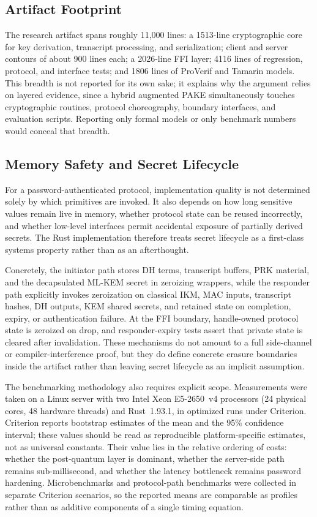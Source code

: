 \documentclass[conference]{IEEEtran}
\begin{document}
\subsection{Artifact Footprint}

The research artifact spans roughly 11{,}000 lines: a 1513-line cryptographic core for key derivation, transcript processing, and serialization; client and server contours of about 900 lines each; a 2026-line FFI layer; 4116 lines of regression, protocol, and interface tests; and 1806 lines of ProVerif and Tamarin models. This breadth is not reported for its own sake; it explains why the argument relies on layered evidence, since a hybrid augmented PAKE simultaneously touches cryptographic routines, protocol choreography, boundary interfaces, and evaluation scripts. Reporting only formal models or only benchmark numbers would conceal that breadth.

\subsection{Memory Safety and Secret Lifecycle}

For a password-authenticated protocol, implementation quality is not determined solely by which primitives are invoked. It also depends on how long sensitive values remain live in memory, whether protocol state can be reused incorrectly, and whether low-level interfaces permit accidental exposure of partially derived secrets. The Rust implementation therefore treats secret lifecycle as a first-class systems property rather than as an afterthought.

Concretely, the initiator path stores DH terms, transcript buffers, PRK material, and the decapsulated ML-KEM secret in zeroizing wrappers, while the responder path explicitly invokes zeroization on classical IKM, MAC inputs, transcript hashes, DH outputs, KEM shared secrets, and retained state on completion, expiry, or authentication failure. At the FFI boundary, handle-owned protocol state is zeroized on drop, and responder-expiry tests assert that private state is cleared after invalidation. These mechanisms do not amount to a full side-channel or compiler-interference proof, but they do define concrete erasure boundaries inside the artifact rather than leaving secret lifecycle as an implicit assumption.


The benchmarking methodology also requires explicit scope. Measurements were taken on a Linux server with two Intel Xeon E5-2650~v4 processors (24 physical cores, 48 hardware threads) and Rust~1.93.1, in optimized runs under Criterion. Criterion reports bootstrap estimates of the mean and the 95\% confidence interval; these values should be read as reproducible platform-specific estimates, not as universal constants. Their value lies in the relative ordering of costs: whether the post-quantum layer is dominant, whether the server-side path remains sub-millisecond, and whether the latency bottleneck remains password hardening. Microbenchmarks and protocol-path benchmarks were collected in separate Criterion scenarios, so the reported means are comparable as profiles rather than as additive components of a single timing equation.
\end{document}
